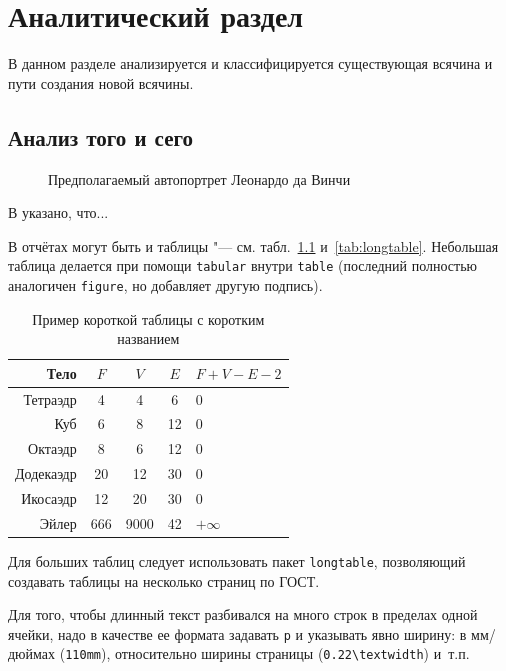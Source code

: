 \chapter{Аналитический раздел}
\label{cha:analysis}
%
%
В данном разделе анализируется и классифицируется существующая всячина и пути создания новой всячины.

\section{Анализ того и сего}

\begin{figure}
  \centering
  \caption{Предполагаемый автопортрет Леонардо да Винчи}
  \label{fig:leonardo}
\end{figure}

В \cite{bib:1} указано, что...

В отчётах могут быть и таблицы "--- см. табл.~\ref{tab:tabular} и~\ref{tab:longtable}.
Небольшая таблица делается при помощи \texttt{tabular} внутри \texttt{table} (последний
полностью аналогичен \texttt{figure}, но добавляет другую подпись).

\begin{table}[ht]
  \caption{Пример короткой таблицы с коротким названием}
  \begin{tabular}{|r|c|c|c|l|}
  \hline
  Тело      & $F$ & $V$  & $E$ & $F+V-E-2$ \\
  \hline
  Тетраэдр  & 4   & 4    & 6   & 0         \\
  Куб       & 6   & 8    & 12  & 0         \\
  Октаэдр   & 8   & 6    & 12  & 0         \\
  Додекаэдр & 20  & 12   & 30  & 0         \\
  Икосаэдр  & 12  & 20   & 30  & 0         \\
  \hline
  Эйлер     & 666 & 9000 & 42  & $+\infty$ \\
  \hline
  \end{tabular}
  \label{tab:tabular}
\end{table}

Для больших таблиц следует использовать пакет \texttt{longtable}, позволяющий создавать
таблицы на несколько страниц по ГОСТ.

Для того, чтобы длинный текст разбивался на много строк в пределах одной ячейки, надо в
качестве ее формата задавать \texttt{p} и указывать явно ширину: в мм/дюймах
(\texttt{110mm}), относительно ширины страницы (\texttt{0.22\textbackslash textwidth})
и~т.п.

